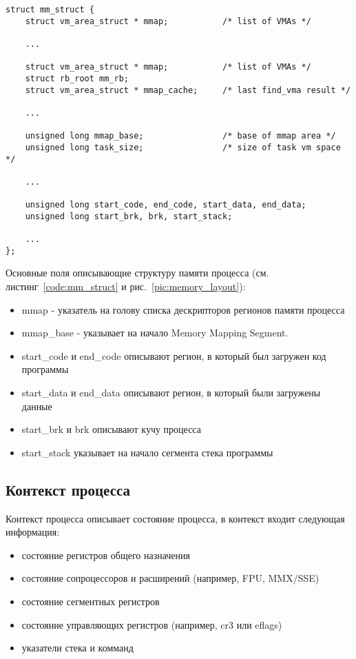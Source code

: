 \begin{lstlisting}[caption=Выборка из структуры struct mm\_struct, label=code:mm_struct]
struct mm_struct {
    struct vm_area_struct * mmap;           /* list of VMAs */

    ...

    struct vm_area_struct * mmap;           /* list of VMAs */
    struct rb_root mm_rb;
    struct vm_area_struct * mmap_cache;     /* last find_vma result */

    ...

    unsigned long mmap_base;                /* base of mmap area */
    unsigned long task_size;                /* size of task vm space */

    ...

    unsigned long start_code, end_code, start_data, end_data;
    unsigned long start_brk, brk, start_stack;

    ...
};
\end{lstlisting}

Основные поля описывающие структуру памяти процесса (см. листинг~\ref{code:mm_struct} и рис.~\ref{pic:memory_layout}):

\begin{itemize}

    \item mmap - указатель на голову списка дескрипторов регионов памяти процесса
    \item mmap\_base - указывает на начало Memory Mapping Segment.
    \item start\_code и end\_code описывают регион, в который был загружен код программы
    \item start\_data и end\_data описывают регион, в который были загружены данные
    \item start\_brk и brk описывают кучу процесса
    \item start\_stack указывает на начало сегмента стека программы

\end{itemize}

\subsection{Контекст процесса}

Контекст процесса описывает состояние процесса, в контекст входит следующая информация:

\begin{itemize}

    \item состояние регистров общего назначения
    \item состояние сопроцессоров и расширений (например, FPU, MMX/SSE)
    \item состояние сегментных регистров
    \item состояние управляющих регистров (например, cr3 или eflags)
    \item указатели стека и комманд

\end{itemize}

